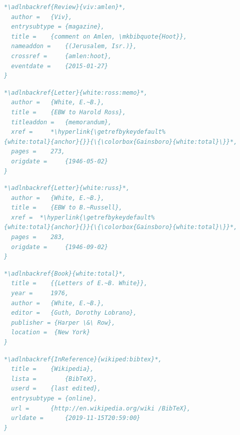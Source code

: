 \documentclass[a4paper,12pt]{article}
\begin{document}
\begin{lstlisting}[language=BibTeX,label=viv:amlen]
*\adlnbackref{Review}{viv:amlen}*,
  author = 	 {Viv},
  entrysubtype = {magazine},
  title = 	 {comment on Amlen, \mkbibquote{Hoot}},
  nameaddon = 	 {(Jerusalem, Isr.)},
  crossref = 	 {amlen:hoot},
  eventdate = 	 {2015-01-27}
}
\end{lstlisting}
\begin{lstlisting}[language=BibTeX,label=white:ross:memo]
*\adlnbackref{Letter}{white:ross:memo}*,
  author = 	 {White, E.~B.},
  title = 	 {EBW to Harold Ross},
  titleaddon = 	 {memorandum},
  xref = 	 *\hyperlink{\getrefbykeydefault%
{white:total}{anchor}{}}{\{\colorbox{Gainsboro}{white:total}\}}*,
  pages = 	 273,
  origdate = 	 {1946-05-02}
}
\end{lstlisting}
\begin{lstlisting}[language=BibTeX,label=white:russ]
*\adlnbackref{Letter}{white:russ}*,
  author = 	 {White, E.~B.},
  title = 	 {EBW to B.~Russell},
  xref =  *\hyperlink{\getrefbykeydefault%
{white:total}{anchor}{}}{\{\colorbox{Gainsboro}{white:total}\}}*,
  pages = 	 283,
  origdate = 	 {1946-09-02}
}
\end{lstlisting}
\begin{lstlisting}[language=BibTeX,label=white:total]
*\adlnbackref{Book}{white:total}*,
  title = 	 {{Letters of E.~B. White}},
  year = 	 1976,
  author = 	 {White, E.~B.},
  editor = 	 {Guth, Dorothy Lobrano},
  publisher = {Harper \&\ Row},
  location =  {New York}
}
\end{lstlisting}
\begin{lstlisting}[language=BibTeX,label=wikiped:bibtex]
*\adlnbackref{InReference}{wikiped:bibtex}*,
  title = 	 {Wikipedia},
  lista =        {BibTeX},
  userd = 	 {last edited},
  entrysubtype = {online},
  url = 	 {http://en.wikipedia.org/wiki /BibTeX},
  urldate = 	 {2019-11-15T20:59:00}
}
\end{lstlisting}
\end{document}
